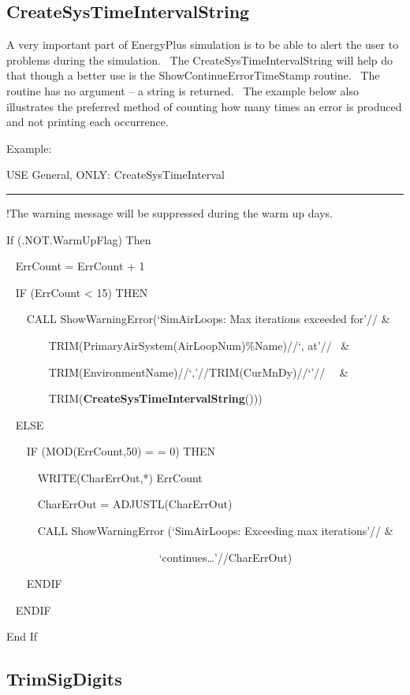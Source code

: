 \subsection{CreateSysTimeIntervalString}\label{createsystimeintervalstring}

A very important part of EnergyPlus simulation is to be able to alert the user to problems during the simulation.~ The CreateSysTimeIntervalString will help do that though a better use is the ShowContinueErrorTimeStamp routine.~ The routine has no argument -- a string is returned.~ The example below also illustrates the preferred method of counting how many times an error is produced and not printing each occurrence.

Example:

USE General, ONLY: CreateSysTimeInterval

\begin{center}\rule{0.5\linewidth}{\linethickness}\end{center}

!The warning message will be suppressed during the warm up days.

If (.NOT.WarmUpFlag) Then

~ ErrCount = ErrCount + 1

~ IF (ErrCount \textless{} 15) THEN

~~~ CALL ShowWarningError(`SimAirLoops: Max iterations exceeded for'// \&

~~~~~~~ TRIM(PrimaryAirSystem(AirLoopNum)\%Name)//`, at'//~ \&

~~~~~~~ TRIM(EnvironmentName)//`,'//TRIM(CurMnDy)//`'//~~ \&

~~~~~~~ TRIM(\textbf{CreateSysTimeIntervalString}()))

~ ELSE

~~~ IF (MOD(ErrCount,50) = = 0) THEN

~~~~~ WRITE(CharErrOut,*) ErrCount

~~~~~ CharErrOut = ADJUSTL(CharErrOut)

~~~~~ CALL ShowWarningError (`SimAirLoops: Exceeding max iterations'// \&

~~~~~~~~~~~~~~~~~~~~~~~~~~~ `continues\ldots{}'//CharErrOut)

~~~ ENDIF

~ ENDIF

End If

\subsection{TrimSigDigits}\label{trimsigdigits}

